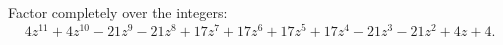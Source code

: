Factor completely over the integers:
\[4z^{11}+4z^{10}-21z^9-21z^8+17z^7+17z^6+17z^5+17z^4-21z^3-21z^2+4z+4.\]
